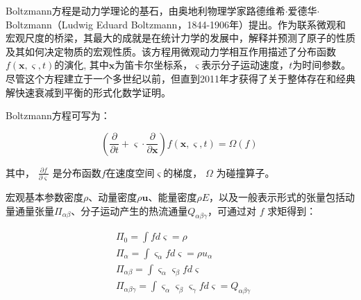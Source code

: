 \documentclass[MathematicsNumericsDerivationsAndOpenFOAM.tex]{subfiles}
\begin{document}
Boltzmann方程是动力学理论的基石，由奥地利物理学家路德维希$\cdot$爱德华$\cdot$Boltzmann（Ludwig Eduard Boltzmann，1844-1906年）提出。作为联系微观和宏观尺度的桥梁，其最大的成就是在统计力学的发展中，解释并预测了原子的性质及其如何决定物质的宏观性质。该方程用微观动力学相互作用描述了分布函数$f(\boldsymbol{x}, \boldsymbol{\varsigma
  }, t)$的演化, 其中$\boldsymbol{x}$为笛卡尔坐标系，$\boldsymbol{\varsigma}$表示分子运动速度，$t$为时间参数。 尽管这个方程建立于一个多世纪以前，但直到2011年才获得了关于整体存在和经典解快速衰减到平衡的形式化数学证明。


Boltzmann方程可写为：


\begin{equation}
  \boxed{
    \left(\frac{ \partial  }{ \partial t}+ \boldsymbol{\varsigma} \cdot \frac{\partial}{\partial \boldsymbol{x}} \right) f(\boldsymbol{x}, \boldsymbol{\varsigma}, t) = \Omega  \left( f \right)
  }
  \label{EQUATION::Bolzmann笛卡尔} ~
\end{equation}


​其中， $\frac{\partial f}{\partial \boldsymbol{\varsigma}}$ 是分布函数$f$在速度空间$\boldsymbol{\varsigma}$的梯度， $\Omega $ 为碰撞算子。

宏观基本参数密度$\rho$、动量密度$\rho \boldsymbol{u}$、能量密度$\rho E$，以及一般表示形式的张量包括动量通量张量$\Pi_{\alpha \beta}$、分子运动产生的热流通量$Q_{\alpha \beta \gamma}$，可通过对 $f$ 求矩得到：

\begin{equation}
  \begin{aligned}
     & \Pi _{0}= \int fd\boldsymbol{\varsigma} = \rho                                                                                                        \\
     & \Pi_{\alpha}=\int \varsigma_{ \alpha }  fd\boldsymbol{\varsigma} = \rho u_{\alpha}                                                                    \\
     & \Pi _{ \alpha  \beta } = \int \varsigma_{ \alpha } \varsigma_{ \beta }fd\boldsymbol{\varsigma}                                                        \\
     & \Pi _{ \alpha  \beta  \gamma}=  \int \varsigma_{ \alpha } \varsigma_{ \beta } \varsigma_{ \gamma}  fd\boldsymbol{\varsigma} = Q_{\alpha \beta \gamma}
  \end{aligned}
  \label{EQUATION::定义张量} ~
\end{equation}
\end{document}
